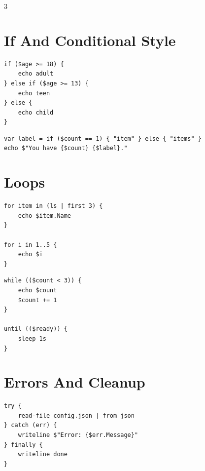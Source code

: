 


\footnotesize
{}

\begin{multicols*}{3}

\section{If And Conditional Style}
\begin{lstlisting}
if ($age >= 18) {
    echo adult
} else if ($age >= 13) {
    echo teen
} else {
    echo child
}
\end{lstlisting}

\begin{lstlisting}
var label = if ($count == 1) { "item" } else { "items" }
echo $"You have {$count} {$label}."
\end{lstlisting}


\section{Loops}
\begin{lstlisting}
for item in (ls | first 3) {
    echo $item.Name
}

for i in 1..5 {
    echo $i
}
\end{lstlisting}

\begin{lstlisting}
while (($count < 3)) {
    echo $count
    $count += 1
}

until (($ready)) {
    sleep 1s
}
\end{lstlisting}


\columnbreak

\section{Errors And Cleanup}
\begin{lstlisting}
try {
    read-file config.json | from json
} catch (err) {
    writeline $"Error: {$err.Message}"
} finally {
    writeline done
}
\end{lstlisting}


\end{multicols*}
